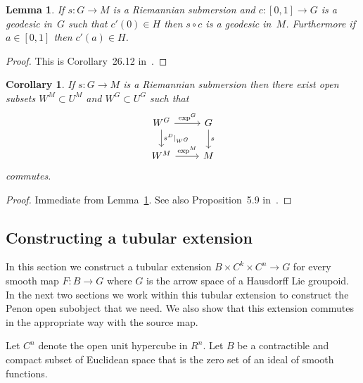 \documentclass[10pt,a4paper]{amsart}
\numberwithin{equation}{section}
\newtheorem{Corollary}[Theorem]{Corollary}
\newtheorem{Lemma}[Theorem]{Lemma}
\begin{document}
\begin{Lemma}\label{lem:geodesics-preserved}
If $s\colon G \rightarrow M$ is a Riemannian submersion and $c\colon [0,1]\rightarrow G$ is a geodesic in~$G$ such that $c'(0)\in H$ then $s\circ c$ is a geodesic in~$M$. Furthermore if $a\in [0,1]$ then $c'(a)\in H$.
\end{Lemma}
\begin{proof}
This is Corollary~26.12 in~\cite{Michor2008}.
\end{proof}

\begin{Corollary}\label{exp-and-source}
If $s\colon G \rightarrow M$ is a Riemannian submersion then there exist open subsets $W^M\subset U^M$ and $W^G\subset U^G$ such that
\begin{equation*}
\begin{tikzcd}
W^G \rar{\exp^G} \dar{s^D|_{W^G}} & G \dar{s}\\
W^M \rar{\exp^M} & M
\end{tikzcd}
\end{equation*}
commutes.
\end{Corollary}
\begin{proof}
Immediate from Lemma~\ref{lem:geodesics-preserved}. See also Proposition~5.9 in~\cite{delHoyo2015}.
\end{proof}

\subsection{Constructing a tubular extension}\label{tubular-extension}

In this section we construct a tubular extension $B\times C^k\times C^n\rightarrow G$ for every smooth map $F\colon B\rightarrow G$ where $G$ is the arrow space of a Hausdorf\/f Lie groupoid. In the next two sections we work within this tubular extension to construct the Penon open subobject that we need. We also show that this extension commutes in the appropriate way with the source map.

\begin{Notation}Let $C^n$ denote the open unit hypercube in $R^n$. Let $B$ be a contractible and compact subset of Euclidean space that is the zero set of an ideal of smooth functions.
\end{Notation}
\end{document}
